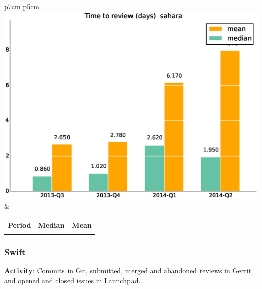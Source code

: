 \documentclass[a4wide,11pt]{report}
\begin{document}
\begin{tabular}{p{7cm} p{5cm}}
    \vspace{0pt} 
    \includegraphics[scale=.35]{figs/timetoreview_mediansahara.eps}
    & 
    \vspace{0pt}
    \begin{tabular}{l|r|r|}%
    \bfseries Period & \bfseries Median & \bfseries Mean %
    \csvreader[head to column names]{data/timetoreview_mediansahara.csv}{}%
    {\\ & \mediantime & \meantime}
    \end{tabular}
\end{tabular}

\newpage 
 \subsubsection{Swift}

\textbf{Activity}: Commits in Git, submitted, merged and abandoned reviews in Gerrit and opened and closed issues in Launchpad.
\end{document}
